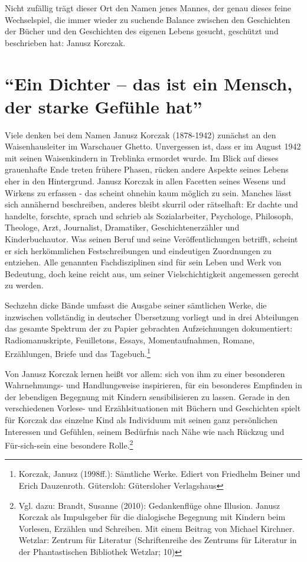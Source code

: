 \documentclass[a4paper,
fontsize=11pt,
oneside,
numbers=noperiodatend,
parskip=half-,
bibliography=totoc,
final
]{scrartcl}
\begin{document}
Nicht zufällig trägt dieser Ort den Namen jenes Mannes, der genau dieses
feine Wechselspiel, die immer wieder zu suchende Balance zwischen den
Geschichten der Bücher und den Geschichten des eigenen Lebens gesucht,
geschützt und beschrieben hat: Janusz Korczak.

\section*{\texorpdfstring{\enquote{Ein Dichter -- das ist ein
Mensch, der starke Gefühle
hat}}{Ein Dichter -- das ist ein Mensch, der starke Gefühle hat}}\label{ein-dichter-das-ist-ein-mensch-der-starke-gefuxfchle-hat}

Viele denken bei dem Namen Janusz Korczak (1878-1942) zunächst an den
Waisenhausleiter im Warschauer Ghetto. Unvergessen ist, dass er im
August 1942 mit seinen Waisenkindern in Treblinka ermordet wurde. Im
Blick auf dieses grauenhafte Ende treten frühere Phasen, rücken andere
Aspekte seines Lebens eher in den Hintergrund. Janusz Korczak in allen
Facetten seines Wesens und Wirkens zu erfassen - das scheint ohnehin
kaum möglich zu sein. Manches lässt sich annähernd beschreiben, anderes
bleibt skurril oder rätselhaft: Er dachte und handelte, forschte, sprach
und schrieb als Sozialarbeiter, Psychologe, Philosoph, Theologe, Arzt,
Journalist, Dramatiker, Geschichtenerzähler und Kinderbuchautor. Was
seinen Beruf und seine Veröffentlichungen betrifft, scheint er sich
herkömmlichen Festschreibungen und eindeutigen Zuordnungen zu entziehen.
Alle genannten Fachdisziplinen sind für sein Leben und Werk von
Bedeutung, doch keine reicht aus, um seiner Vielschichtigkeit angemessen
gerecht zu werden.

Sechzehn dicke Bände umfasst die Ausgabe seiner sämtlichen Werke, die
inzwischen vollständig in deutscher Übersetzung vorliegt und in drei
Abteilungen das gesamte Spektrum der zu Papier gebrachten Aufzeichnungen
dokumentiert: Radiomanuskripte, Feuilletons, Essays, Momentaufnahmen,
Romane, Erzählungen, Briefe und das Tagebuch.\footnote{Korczak, Janusz
  (1998ff.): Sämtliche Werke. Ediert von Friedhelm Beiner und Erich
  Dauzenroth. Gütersloh: Gütersloher Verlagshaus}

Von Janusz Korczak lernen heißt vor allem: sich von ihm zu einer
besonderen Wahrnehmungs- und Handlungsweise inspirieren, für ein
besonderes Empfinden in der lebendigen Begegnung mit Kindern
sensibilisieren zu lassen. Gerade in den verschiedenen Vorlese- und
Erzählsituationen mit Büchern und Geschichten spielt für Korczak das
einzelne Kind als Individuum mit seinen ganz persönlichen Interessen und
Gefühlen, seinem Bedürfnis nach Nähe wie nach Rückzug und Für-sich-sein
eine besondere Rolle.\footnote{Vgl. dazu: Brandt, Susanne (2010):
  Gedankenflüge ohne Illusion. Janusz Korczak als Impulsgeber für die
  dialogische Begegnung mit Kindern beim Vorlesen, Erzählen und
  Schreiben. Mit einem Beitrag von Michael Kirchner. Wetzlar: Zentrum
  für Literatur (Schriftenreihe des Zentrums für Literatur in der
  Phantastischen Bibliothek Wetzlar; 10)}
\end{document}

